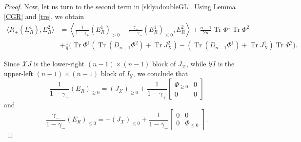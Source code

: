 \documentclass{amsart}
\theoremstyle{definition}
\theoremstyle{remark}
\numberwithin{equation}{section}
\numberwithin{theorem}{section}
\begin{document}
\begin{proof}
Now, let us turn to the second term in \eqref{sklyadoubleGL}. 
Using Lemma \ref{CGR} and \eqref{tre}, we obtain
\begin{equation}\label{3}
\begin{aligned}
\langle R_+(E^1_R), E_R^2\rangle&= \left \langle  \frac{1}{1-\gamma_+} 
(E^1_R)_{>0} - \frac{\gamma_-}{1-\gamma_-}(E^1_R)_{\leq 0}, E_R^2 \right \rangle 
+  \frac {n-1} {2n} {\operatorname{Tr}}{\Phi}^1 {\operatorname{Tr}}{\Phi}^2  \\ 
&
+ \frac{1}{n} \big ({\operatorname{Tr}}{\Phi}^1 ( {\operatorname{Tr}}(D_{n-1} {\Phi}^2)+{\operatorname{Tr}} J_X^2) - ({\operatorname{Tr}} (D_{n-1} {\Phi}^1)+{\operatorname{Tr}} J_X^1)
{\operatorname{Tr}} \Phi^2 \big ).
\end{aligned}
\end{equation}

Since ${{\mathcal X}} J$ is the lower-right $(n-1)\times (n-1)$ block of $J_{{\mathcal X}}$, while
${{\mathcal Y}} I$ is the upper-left $(n-1)\times (n-1)$ block of $I_{{\mathcal Y}}$,
we conclude that
$$
\frac {1}{1-\gamma_+}(E_R )_{\geq 0} =  
(J_{{\mathcal X}})_{\geq 0}+ \frac {1}{1-\gamma_+}
\left [\begin{array}{cc}
{\Phi}_{\geq 0} & 0 \\  0 & 0\end{array}\right ]
$$
and
$$
\frac {\gamma_-}{1-\gamma_-} \left (E_R\right )_{\leq 0} = 
-(J_{{\mathcal X}})_{\leq 0} + \frac {1}{1-\gamma_-}
\left [\begin{array}{cc} 0 & 0 \\
0 & {\Phi}_{\leq 0} \end{array}\right].
$$


\end{proof}
\end{document}
